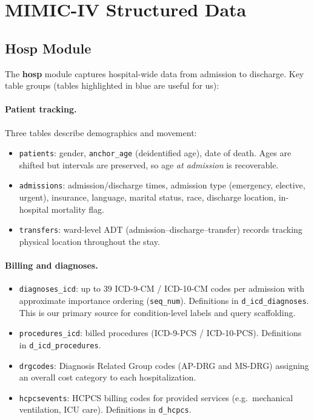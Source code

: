 \documentclass[11pt,a4paper]{article}
\newcommand{\field}[1]{\nolinkurl{#1}}
\newcommand{\importantfield}[1]{\textcolor{betterblue}{\nolinkurl{#1}}}
\begin{document}
\section{MIMIC-IV Structured Data}
\label{sec:structured-data-detail}

\subsection{Hosp Module}
\label{sec:hosp}

The \textbf{hosp} module captures hospital-wide data from admission to discharge.
Key table groups (tables \textcolor{betterblue}{highlighted in blue} are useful for us):

\paragraph{Patient tracking.}
Three tables describe demographics and movement:
\begin{itemize}[itemsep=2pt, parsep=1pt]
	\item \importantfield{patients}: gender, \field{anchor\_age} (deidentified age), date of death.
	      Ages are shifted but intervals are preserved, so age \emph{at admission} is recoverable.
	\item \importantfield{admissions}: admission/discharge times, admission type (emergency, elective, urgent),
	      insurance, language, marital status, race, discharge location, in-hospital mortality flag.
	\item \field{transfers}: ward-level ADT (admission--discharge--transfer) records tracking
	      physical location throughout the stay.
\end{itemize}

\paragraph{Billing and diagnoses.}
\begin{itemize}[itemsep=2pt, parsep=1pt]
	\item \importantfield{diagnoses\_icd}: up to 39 ICD-9-CM / ICD-10-CM codes per admission with
	      approximate importance ordering (\field{seq\_num}).  Definitions in \importantfield{d\_icd\_diagnoses}.
	      This is our primary source for condition-level labels and query scaffolding.
	\item \field{procedures\_icd}: billed procedures (ICD-9-PCS / ICD-10-PCS).
	      Definitions in \field{d\_icd\_procedures}.
	\item \field{drgcodes}: Diagnosis Related Group codes (AP-DRG and MS-DRG) assigning an
	      overall cost category to each hospitalization.
	\item \field{hcpcsevents}: HCPCS billing codes for provided services (e.g.\ mechanical
	      ventilation, ICU care).  Definitions in \field{d\_hcpcs}.
\end{itemize}
\end{document}
